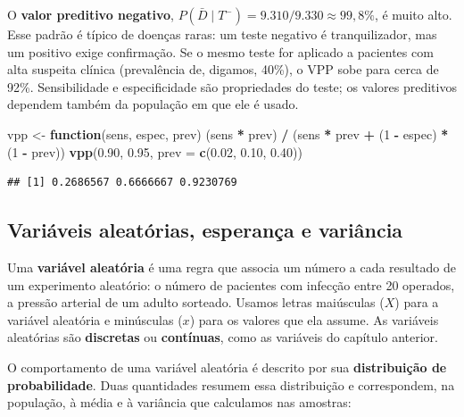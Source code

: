 \documentclass[
]{book}
\newenvironment{Shaded}{\begin{snugshade}}{\end{snugshade}}
\newcommand{\AttributeTok}[1]{\textcolor[rgb]{0.13,0.29,0.53}{#1}}
\newcommand{\ControlFlowTok}[1]{\textcolor[rgb]{0.13,0.29,0.53}{\textbf{#1}}}
\newcommand{\DecValTok}[1]{\textcolor[rgb]{0.00,0.00,0.81}{#1}}
\newcommand{\FloatTok}[1]{\textcolor[rgb]{0.00,0.00,0.81}{#1}}
\newcommand{\FunctionTok}[1]{\textcolor[rgb]{0.13,0.29,0.53}{\textbf{#1}}}
\newcommand{\NormalTok}[1]{#1}
\newcommand{\OtherTok}[1]{\textcolor[rgb]{0.56,0.35,0.01}{#1}}
\newcommand{\SpecialCharTok}[1]{\textcolor[rgb]{0.81,0.36,0.00}{\textbf{#1}}}
\begin{document}
O \textbf{valor preditivo negativo}, \(P(\bar{D} \mid T^-) = 9.310/9.330 \approx 99{,}8\%\), é muito alto. Esse padrão é típico de doenças raras: um teste negativo é tranquilizador, mas um positivo exige confirmação. Se o mesmo teste for aplicado a pacientes com alta suspeita clínica (prevalência de, digamos, 40\%), o VPP sobe para cerca de 92\%. Sensibilidade e especificidade são propriedades do teste; os valores preditivos dependem também da população em que ele é usado.

\begin{Shaded}
\begin{Highlighting}[]
\NormalTok{vpp }\OtherTok{\textless{}{-}} \ControlFlowTok{function}\NormalTok{(sens, espec, prev) (sens }\SpecialCharTok{*}\NormalTok{ prev) }\SpecialCharTok{/}\NormalTok{ (sens }\SpecialCharTok{*}\NormalTok{ prev }\SpecialCharTok{+}\NormalTok{ (}\DecValTok{1} \SpecialCharTok{{-}}\NormalTok{ espec) }\SpecialCharTok{*}\NormalTok{ (}\DecValTok{1} \SpecialCharTok{{-}}\NormalTok{ prev))}
\FunctionTok{vpp}\NormalTok{(}\FloatTok{0.90}\NormalTok{, }\FloatTok{0.95}\NormalTok{, }\AttributeTok{prev =} \FunctionTok{c}\NormalTok{(}\FloatTok{0.02}\NormalTok{, }\FloatTok{0.10}\NormalTok{, }\FloatTok{0.40}\NormalTok{))}
\end{Highlighting}
\end{Shaded}

\begin{verbatim}
## [1] 0.2686567 0.6666667 0.9230769
\end{verbatim}

\subsection{Variáveis aleatórias, esperança e variância}\label{variuxe1veis-aleatuxf3rias-esperanuxe7a-e-variuxe2ncia}

Uma \textbf{variável aleatória} é uma regra que associa um número a cada resultado de um experimento aleatório: o número de pacientes com infecção entre 20 operados, a pressão arterial de um adulto sorteado. Usamos letras maiúsculas (\(X\)) para a variável aleatória e minúsculas (\(x\)) para os valores que ela assume. As variáveis aleatórias são \textbf{discretas} ou \textbf{contínuas}, como as variáveis do capítulo anterior.

O comportamento de uma variável aleatória é descrito por sua \textbf{distribuição de probabilidade}. Duas quantidades resumem essa distribuição e correspondem, na população, à média e à variância que calculamos nas amostras:
\end{document}
